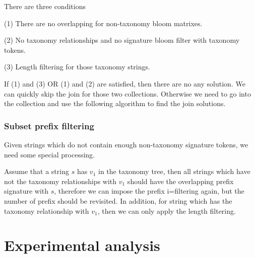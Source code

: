 \documentclass{sig-alternate}
\begin{document}
There are three conditions

(1) There are no overlapping for non-taxonomy bloom matrixes.

(2) No taxonomy relationships and no signature bloom filter with taxonomy tokens.

(3) Length filtering for those taxonomy strings.

If (1) and (3) OR (1) and (2) are satisfied, then there are no any solution. We can quickly skip the join for those two collections. Otherwise we need to go into the collection and use the following algorithm to find the join solutions.


\subsubsection{Subset prefix filtering}

Given strings which do not contain enough non-taxonomy signature tokens, we need some special processing.

Assume that a string $s$ has $v_1$ in the taxonomy tree, then all strings which have not the taxonomy relationships with $v_1$ should have the overlapping prefix signature with $s$, therefore we can impose the prefix i=filtering again, but the number of prefix should be revisited. In addition, for string which has the taxonomy relationship with $v_1$, then we can only apply the length filtering.




\section{Experimental analysis}
\end{document}
